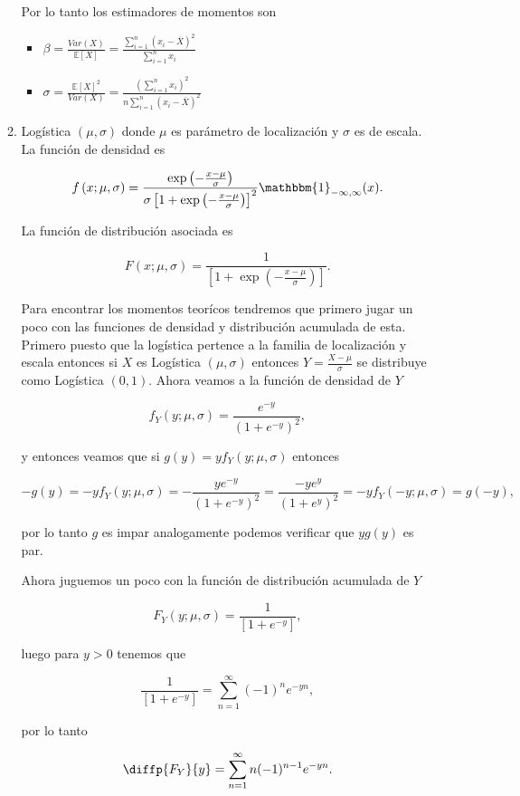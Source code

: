 \documentclass[letterpaper]{article}
\theoremstyle{definition}
\theoremstyle{lemathm}
\theoremstyle{lemathm}
\theoremstyle{lemathm}
\theoremstyle{lemademthm}
\newcommand{\pars}[1]{\left( #1 \right) }
\newcommand{\bracs}[1]{\left[ #1 \right] }
\newcommand{\EE}{\mathbb{E}}
\newcommand{\1}{\mathbbm{1}}
\begin{document}
\begin{enumerate}
\begin{enumerate}
			Por lo tanto los estimadores de momentos son

			\begin{itemize}
				\item $\beta = \frac{Var\pars{X}}{\EE\bracs{X}} = \frac{\sum_{i=1}^n \pars{x_i-\overline{X}}^2}{\sum_{i=1}^n x_i}$
				\item $\sigma = \frac{\EE\bracs{X}^2}{Var\pars{X}} = \frac{\pars{\sum_{i=1}^n x_i}^2}{n\sum_{i=1}^n \pars{x_i-\overline{X}}^2}$
			\end{itemize}

			\item Logística $\pars{\mu,\sigma}$ donde $\mu$ es parámetro de localización y $\sigma$ es de escala. La función de densidad es
			
			\[f\pars{x;\mu,\sigma} = \frac{\exp\pars{-\frac{x-\mu}{\sigma}}}{\sigma\bracs{1+\exp\pars{-\frac{x-\mu}{\sigma}}}^2}\1_{-\infty,\infty}(x).\]

			La función de distribución asociada es

			\[F(x;\mu,\sigma) = \frac{1}{\bracs{1+\exp\pars{-\frac{x-\mu}{\sigma}}}}.\]

			Para encontrar los momentos teorícos tendremos que primero jugar un poco con las funciones de densidad y distribución acumulada de esta. Primero puesto que la logística pertence a la familia de localización y escala entonces si $X$ es Logística $\pars{\mu,\sigma}$ entonces $Y = \frac{X-\mu}{\sigma}$ se distribuye como Logística $\pars{0,1}$. Ahora veamos a la función de densidad de $Y$

			\[f_Y(y;\mu,\sigma) = \frac{e^{-y}}{\pars{1+e^{-y}}^2},\]

			y entonces veamos que si $g(y) = yf_Y(y;\mu,\sigma)$ entonces

			\[-g(y) = -yf_Y(y;\mu,\sigma) = -\frac{ye^{-y}}{\pars{1+e^{-y}}^2} = \frac{-ye^{y}}{\pars{1+e^{y}}^2} = -yf_Y(-y;\mu,\sigma) = g(-y),\]

			por lo tanto $g$ es impar analogamente podemos verificar que $yg(y)$ es par.

			Ahora juguemos un poco con la función de distribución acumulada de $Y$

			\[F_Y(y;\mu,\sigma) = \frac{1}{\bracs{1+e^{-y}}},\]

			luego para $y > 0$ tenemos que

			\[\frac{1}{\bracs{1+e^{-y}}} = \sum_{n=1}^{\infty} (-1)^n e^{-yn},\]

			por lo tanto

			\[\diffp{F_Y}{y} = \sum_{n=1}^{\infty} n (-1)^{n-1} e^{-yn}.\]


\end{enumerate}
\end{enumerate}
\end{document}
